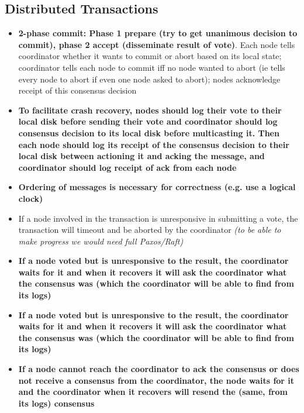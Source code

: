 \documentclass[20pt,a4paper,landscape]{extarticle}
\begin{document}
\begin{flushleft}
\subsection{Distributed Transactions}
\begin{itemize}
\item \textbf{2-phase commit: Phase 1 prepare (try to get unanimous decision to commit), phase 2 accept (disseminate result of vote)}. Each node tells coordinator whether it wants to commit or abort based on its local state; coordinator tells each node to commit iff no node wanted to abort (ie tells every node to abort if even one node asked to abort); nodes acknowledge receipt of this consensus decision
\item \textbf{To facilitate crash recovery, nodes should log their vote to their local disk before sending their vote and coordinator should log consensus decision to its local disk before multicasting it. Then each node should log its receipt of the consensus decision to their local disk between actioning it and acking the message, and coordinator should log receipt of ack from each node}
\item \textbf{Ordering of messages is necessary for correctness (e.g. use a logical clock)}
\item If a node involved in the transaction is unresponsive in submitting a vote, the transaction will timeout and be aborted by the coordinator \textit{(to be able to make progress we would need full Paxos/Raft)}
\item \textbf{If a node voted but is unresponsive to the result, the coordinator waits for it and when it recovers it will ask the coordinator what the consensus was (which the coordinator will be able to find from its logs)}
\item \textbf{If a node voted but is unresponsive to the result, the coordinator waits for it and when it recovers it will ask the coordinator what the consensus was (which the coordinator will be able to find from its logs)}
\item \textbf{If a node cannot reach the coordinator to ack the consensus or does not receive a consensus from the coordinator, the node waits for it and the coordinator when it recovers will resend the (same, from its logs) consensus}
\end{itemize}
\end{flushleft}
\end{document}
